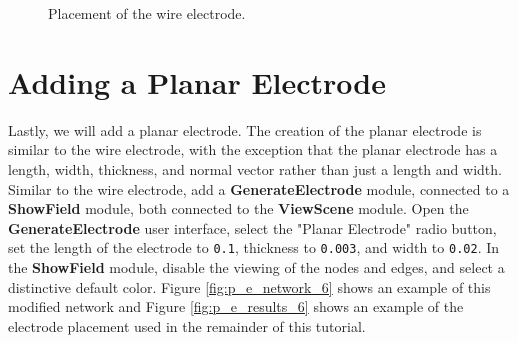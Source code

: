 \documentclass[fleqn,11pt,openany]{book}
\begin{document}
\begin{figure}
\caption{Placement of the wire electrode.}\label{fig:p_e_results_5}
\end{figure}

\section{Adding a Planar Electrode}

Lastly, we will add a planar electrode. The creation of the planar
electrode is similar to the wire electrode, with the exception that
the planar electrode has a length, width, thickness, and normal vector
rather than just a length and width. Similar to the wire electrode,
add a {\bf GenerateElectrode} module, connected to a {\bf
ShowField} module, both connected to the {\bf ViewScene} module. Open
the {\bf GenerateElectrode} user interface, select the "Planar Electrode" radio button, set the length of
the electrode to {\tt 0.1}, thickness to {\tt 0.003}, and width to
{\tt 0.02}. In the {\bf ShowField} module, disable the viewing of the
nodes and edges, and select a distinctive default color. Figure
\ref{fig:p_e_network_6} shows an example of this modified network and
Figure \ref{fig:p_e_results_6} shows an example of the electrode
placement used in the remainder of this tutorial.
\end{document}
